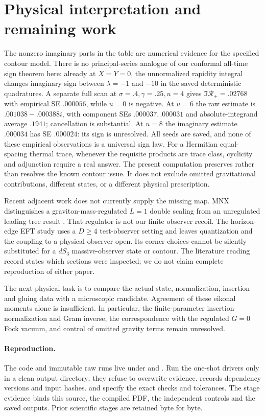 \documentclass[11pt,a4paper]{article}
\newcommand{\R}{\mathcal R}
\begin{document}
\newpage
\section{Physical interpretation and remaining work}
The nonzero imaginary parts in the table are numerical evidence for
the specified contour model. There is no principal-series analogue
of our conformal all-time sign theorem here: already at $X=Y=0$,
the unnormalized rapidity integral changes imaginary sign between
$\lambda=-1$ and $-10$ in the saved deterministic quadratures.
A separate full scan at $\sigma=.4,\gamma=.25,u=4$ gives
$\Im\R_+=.02768$ with empirical SE $.000056$, while $u=0$ is negative.
At $u=6$ the raw estimate is $.001038-.000388i$, with component
SEs $.000037,.000031$ and absolute-integrand average $.1941$;
cancellation is substantial. At $u=8$ the imaginary estimate
$.000034$ has SE $.000024$: its sign is unresolved. All seeds are
saved, and none of these empirical observations is a universal sign law.
For a Hermitian equal-spacing thermal trace, whenever the requisite
products are trace class, cyclicity and adjunction require a real
answer. The present computation preserves rather than resolves the
known contour issue. It does not exclude omitted gravitational
contributions, different states, or a different physical prescription.

Recent adjacent work does not currently supply the missing map.
MNX distinguishes a graviton-mass-regulated $L=1$ double scaling from
an unregulated leading tree result \cite{mnx}. That regulator is not
our finite observer recoil. The horizon-edge EFT study \cite{edge}
uses a $D\geq4$ test-observer setting and leaves quantization and the
coupling to a physical observer open. Its corner choices cannot be
silently substituted for a $dS_3$ massive-observer state or contour.
The literature reading record states which sections were inspected;
we do not claim complete reproduction of either paper.

The next physical task is to compare the actual state, normalization,
insertion and gluing data with a microscopic candidate. Agreement
of these eikonal moments alone is insufficient. In particular,
the finite-parameter insertion normalization and Gram inverse,
the correspondence with the regulated $G=0$ Fock vacuum, and
control of omitted gravity terms remain unresolved.

\paragraph{Reproduction.}
The code and immutable raw runs live under  and
. Run the one-shot drivers
only in a clean output directory; they refuse to overwrite evidence.
 records dependency versions and input hashes.
 and  specify the exact
checks and tolerances. The stage evidence binds this source, the
compiled PDF, the independent controls and the saved outputs.
Prior scientific stages are retained byte for byte.
\end{document}
